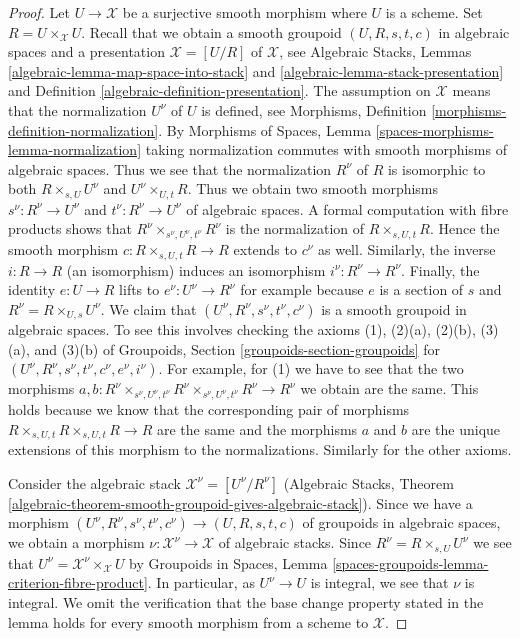 \begin{proof}
Let $U \to \mathcal{X}$ be a surjective smooth morphism where $U$ is a scheme.
Set $R = U \times_\mathcal{X} U$. Recall that we obtain a smooth groupoid
$(U, R, s, t, c)$ in algebraic spaces and a presentation
$\mathcal{X} = [U/R]$ of $\mathcal{X}$, see Algebraic Stacks,
Lemmas \ref{algebraic-lemma-map-space-into-stack} and
\ref{algebraic-lemma-stack-presentation} and
Definition \ref{algebraic-definition-presentation}.
The assumption on $\mathcal{X}$ means that the normalization
$U^\nu$ of $U$ is defined, see Morphisms, Definition
\ref{morphisms-definition-normalization}.
By Morphisms of Spaces, Lemma
\ref{spaces-morphisms-lemma-normalization}
taking normalization commutes with smooth morphisms of algebraic spaces.
Thus we see that the normalization $R^\nu$ of $R$
is isomorphic to both $R \times_{s, U} U^\nu$ and $U^\nu \times_{U, t} R$.
Thus we obtain two smooth morphisms
$s^\nu : R^\nu \to U^\nu$ and $t^\nu : R^\nu \to U^\nu$
of algebraic spaces. A formal computation with fibre products shows that
$R^\nu \times_{s^\nu, U^\nu, t^\nu} R^\nu$ is the normalization
of $R \times_{s, U, t} R$. Hence the smooth morphism
$c : R \times_{s, U, t} R \to R$ extends to $c^\nu$ as well.
Similarly, the inverse $i : R \to R$ (an isomorphism) induces
an isomorphism $i^\nu : R^\nu \to R^\nu$. Finally, the identity
$e : U \to R$ lifts to $e^\nu : U^\nu \to R^\nu$ for example
because $e$ is a section of $s$ and $R^\nu = R \times_{U, s} U^\nu$.
We claim that $(U^\nu, R^\nu, s^\nu, t^\nu, c^\nu)$ is
a smooth groupoid in algebraic spaces. To see this involves checking
the axioms (1), (2)(a), (2)(b), (3)(a), and (3)(b) of
Groupoids, Section \ref{groupoids-section-groupoids}
for $(U^\nu, R^\nu, s^\nu, t^\nu, c^\nu, e^\nu, i^\nu)$.
For example, for (1) we have to see that the two morphisms
$a, b : R^\nu \times_{s^\nu, U^\nu, t^\nu} R^\nu
\times_{s^\nu, U^\nu, t^\nu} R^\nu \to R^\nu$ we obtain are the same.
This holds because we know that the corresponding pair of morphisms
$R \times_{s, U, t} R \times_{s, U, t} R \to R$
are the same and the morphisms $a$ and $b$ are the unique extensions
of this morphism to the normalizations. Similarly for the other
axioms.

\medskip\noindent
Consider the algebraic stack $\mathcal{X}^\nu = [U^\nu/R^\nu]$
(Algebraic Stacks, Theorem
\ref{algebraic-theorem-smooth-groupoid-gives-algebraic-stack}).
Since we have a morphism
$(U^\nu, R^\nu, s^\nu, t^\nu, c^\nu) \to (U, R, s, t, c)$
of groupoids in algebraic spaces, we obtain a morphism
$\nu : \mathcal{X}^\nu \to \mathcal{X}$ of algebraic stacks.
Since $R^\nu = R \times_{s, U} U^\nu$ we see that
$U^\nu = \mathcal{X}^\nu \times_\mathcal{X} U$ by
Groupoids in Spaces, Lemma
\ref{spaces-groupoids-lemma-criterion-fibre-product}.
In particular, as $U^\nu \to U$ is integral, we see that $\nu$ is integral.
We omit the verification that the base change property
stated in the lemma holds for every smooth morphism from a scheme to
$\mathcal{X}$.
\end{proof}

